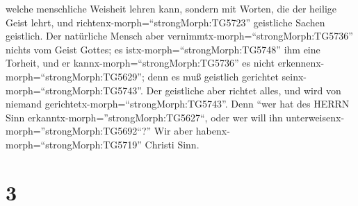 welche menschliche Weisheit lehren kann, sondern mit Worten, die der
heilige Geist lehrt, und richtenx-morph=``strongMorph:TG5723''
geistliche Sachen geistlich.  Der natürliche Mensch aber
vernimmtx-morph=``strongMorph:TG5736'' nichts vom Geist Gottes; es
istx-morph=``strongMorph:TG5748'' ihm eine Torheit, und er
kannx-morph=``strongMorph:TG5736'' es nicht
erkennenx-morph=``strongMorph:TG5629''; denn es muß geistlich gerichtet
seinx-morph=``strongMorph:TG5743''.  Der geistliche aber
richtet alles, und wird von niemand
gerichtetx-morph=``strongMorph:TG5743''.  Denn ``wer hat
des HERRN Sinn erkanntx-morph=''strongMorph:TG5627``, oder wer will ihn
unterweisenx-morph=''strongMorph:TG5692``?'' Wir aber
habenx-morph=``strongMorph:TG5719'' Christi Sinn.

\hypertarget{section-2}{%
\section{3}\label{section-2}}

